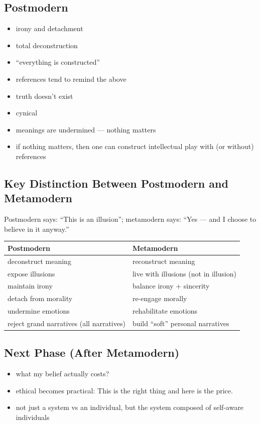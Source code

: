 \documentclass[12pt]{article}
\begin{document}
\subsection{Postmodern}

\begin{itemize}
  \item irony and detachment
  \item total deconstruction
  \item “everything is constructed”
  \item references tend to remind the above
  \item truth doesn’t exist
  \item cynical
  \item meanings are undermined — nothing matters
  \item if nothing matters, then one can construct intellectual play with (or without) references
\end{itemize}

\subsection{Key Distinction Between Postmodern and Metamodern}

Postmodern says: “This is an illusion”; metamodern says: “Yes — and I choose to believe in it anyway.”

\begin{center}
\begin{tabular}{p{} p{}}
  \textbf{Postmodern} & \textbf{Metamodern} \\
  \hline
  deconstruct meaning & reconstruct meaning \\
  expose illusions & live with illusions (not in illusion) \\
  maintain irony & balance irony + sincerity \\
  detach from morality & re-engage morally \\
  undermine emotions & rehabilitate emotions \\
  reject grand narratives (all narratives) & build “soft” personal narratives
\end{tabular}
\end{center}

\subsection{Next Phase (After Metamodern)}

\begin{itemize}
  \item what my belief actually costs?
  \item ethical becomes practical: This is the right thing and here is the price.
  \item not just a system vs an individual, but the system composed of self-aware individuals
\end{itemize}
\end{document}
